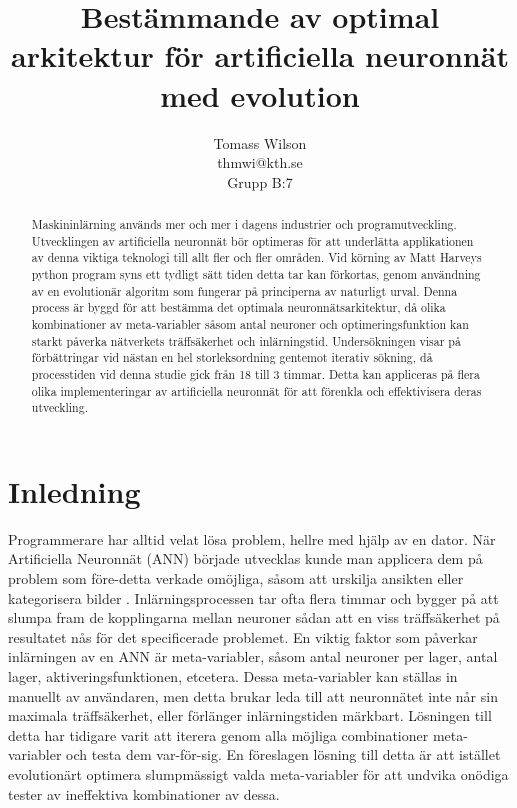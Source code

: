 \documentclass[a4paper, 12pt]{article}
\title{Bestämmande av optimal arkitektur för artificiella neuronnät med evolution}
\author{Tomass Wilson\\thmwi@kth.se\\Grupp B:7}
\begin{document}

  \maketitle

  \begin{abstract}
    Maskininlärning används mer och mer i dagens industrier och programutveckling. Utvecklingen av artificiella neuronnät bör optimeras för att underlätta applikationen av denna viktiga teknologi till allt fler och fler områden. Vid körning av Matt Harveys python program \parencite{harvey2017} syns ett tydligt sätt tiden detta tar kan förkortas, genom användning av en evolutionär algoritm som fungerar på principerna av naturligt urval. Denna process är byggd för att bestämma det optimala neuronnätsarkitektur, då olika kombinationer av meta-variabler såsom antal neuroner och optimeringsfunktion kan starkt påverka nätverkets träffsäkerhet och inlärningstid. Undersökningen visar på förbättringar vid nästan en hel storleksordning gentemot iterativ sökning, då processtiden vid denna studie gick från 18 till 3 timmar. Detta kan appliceras på flera olika implementeringar av artificiella neuronnät för att förenkla och effektivisera deras utveckling.
  \end{abstract}

  \newpage


  \tableofcontents

  \newpage


  \section{Inledning}
    Programmerare har alltid velat lösa problem, hellre med hjälp av en dator. När Artificiella Neuronnät (ANN) började utvecklas kunde man applicera dem på problem som före-detta verkade omöjliga, såsom att urskilja ansikten eller kategorisera bilder \parencite{hopfield1988artificial}. Inlärningsprocessen tar ofta flera timmar och bygger på att slumpa fram de kopplingarna mellan neuroner sådan att en viss träffsäkerhet på resultatet nås för det specificerade problemet. En viktig faktor som påverkar inlärningen av en ANN är meta-variabler, såsom antal neuroner per lager, antal lager, aktiveringsfunktionen, etcetera. Dessa meta-variabler kan ställas in manuellt av användaren, men detta brukar leda till att neuronnätet inte når sin maximala träffsäkerhet, eller förlänger inlärningstiden märkbart. Lösningen till detta har tidigare varit att iterera genom alla möjliga combinationer meta-variabler och testa dem var-för-sig. En föreslagen lösning till detta är att istället evolutionärt optimera slumpmässigt valda meta-variabler för att undvika onödiga tester av ineffektiva kombinationer av dessa.
\end{document}
